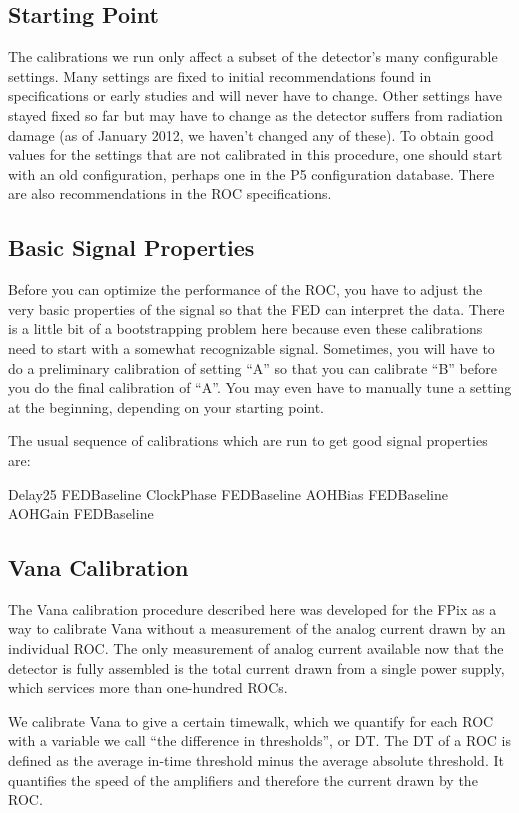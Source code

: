 
\subsection{Starting Point}
The calibrations we run only affect a subset of the detector's many configurable settings.  Many settings are fixed to initial recommendations found in specifications or early studies and will never have to change.  Other settings have stayed fixed so far but may have to change as the detector suffers from radiation damage (as of January 2012, we haven't changed any of these). To obtain good values for the settings that are not calibrated  in this procedure, one should start with an old configuration, perhaps one in the P5 configuration database.  There are also recommendations in the ROC specifications.

\subsection{Basic Signal Properties}
Before you can optimize the performance of the ROC, you have to adjust the very basic properties of the signal so that the FED can interpret the data. There is a little bit of a bootstrapping problem here because even these calibrations need to start with a somewhat recognizable signal. Sometimes, you will have to do a preliminary calibration of setting ``A'' so that you can calibrate ``B'' before you do the final calibration of ``A''. You may even have to manually tune a setting at the beginning, depending on your starting point.

The usual sequence of calibrations which are run to get good signal properties are:

Delay25
FEDBaseline
ClockPhase
FEDBaseline
AOHBias
FEDBaseline
AOHGain
FEDBaseline

\subsection{Vana Calibration}
The Vana calibration procedure described here was developed for the FPix as a way  to calibrate Vana without a measurement of the analog current drawn by an individual ROC. The only measurement of analog current available now that the detector is fully assembled  is the total current drawn from a single power supply, which services more than one-hundred ROCs.  

We calibrate Vana to give a certain timewalk, which we quantify for each ROC with a variable we call  ``the difference in thresholds'', or DT.  The DT of a ROC is defined as the average in-time  threshold minus the average absolute threshold. It quantifies the speed of the amplifiers and therefore the current drawn by the ROC. 

